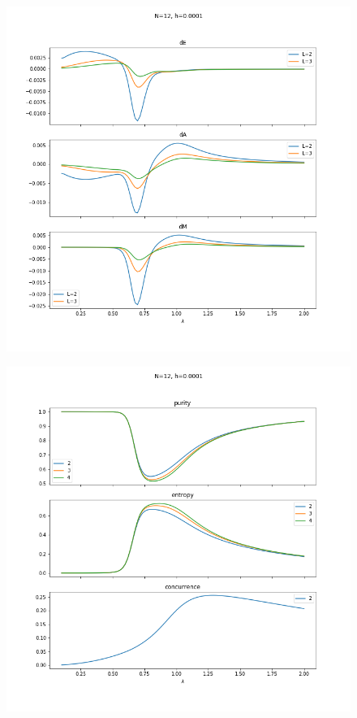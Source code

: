 \documentclass[12pt,a4paper]{article}
\begin{document}
	\begin{figure}[h]
		\centering
		\includegraphics[width=\linewidth]{h1_dergos}
		\caption{}
		\label{fig:h1dergos}
	\end{figure}	
	
	\begin{figure}[h]
		\centering
		\includegraphics[width=\linewidth]{h1_quantities}
		\caption{}
		\label{fig:h1quantities}
	\end{figure}
	
\end{document}
